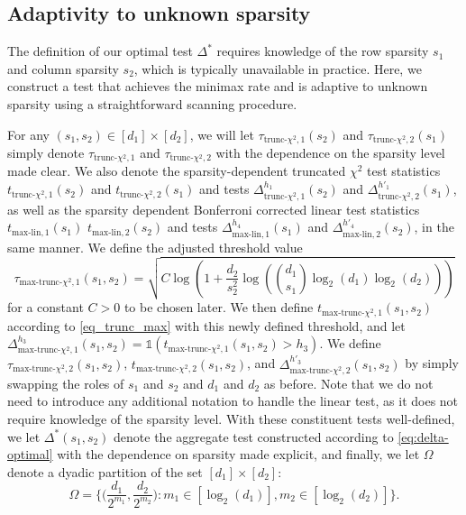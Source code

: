 \documentclass{article}
\newcommand{\one}{\mathds{1}}
\newcommand{\chisqlin}{\text{trunc-$\chi^2$}}
\newcommand{\chisqmax}{\text{max-trunc-$\chi^2$}}
\newcommand{\linmax}{\text{max-lin}}
\theoremstyle{remark}
\begin{document}
\subsection{Adaptivity to unknown sparsity}

The definition of our optimal test $\Delta^*$ requires knowledge of the row sparsity $s_1$ and column sparsity  $s_2$, which is typically unavailable in practice. Here, we construct a test that achieves the minimax rate and is adaptive to unknown sparsity using a straightforward scanning procedure.

For any $(s_1, s_2) \in [d_1] \times [d_2]$, we will let $\tau_{\chisqlin, 1}(s_2)$ and $\tau_{\chisqlin, 2}(s_1)$ simply denote $\tau_{\chisqlin, 1}$ and $\tau_{\chisqlin, 2}$ with the dependence on the sparsity level made clear. We also denote the sparsity-dependent truncated $\chi^2$ test statistics $t_{\chisqlin, 1}(s_2)$ and $t_{\chisqlin, 2}(s_1)$ and tests  $\Delta^{h_1}_{\chisqlin, 1}(s_2)$ and $\Delta^{h'_1}_{\chisqlin, 2}(s_1)$, as well as the sparsity dependent Bonferroni corrected linear test statistics $t_{\linmax, 1}(s_1)$ $t_{\linmax, 2}(s_2)$ and tests $\Delta^{h_4}_{\linmax, 1}(s_1)$ and $\Delta^{h'_4}_{\linmax, 2}(s_2)$, in the same manner. We define the adjusted threshold value
\begin{equation}
    \tau_{\chisqmax, 1}(s_1, s_2) = \sqrt{C\log\left(1 + \frac{d_2}{s_2^2}\log \left({d_1 \choose s_1}\log_2(d_1)\log_2(d_2)\right)\right)}
\end{equation}
for a constant $C > 0$ to be chosen later. We then define $t_{\chisqmax, 1}(s_1, s_2)$ according to \eqref{eq_trunc_max} with this newly defined threshold, and let $\Delta^{h_3}_{\chisqmax, 1}(s_1, s_2) = \one(t_{\chisqmax, 1}(s_1, s_2) > h_3)$. We define $\tau_{\chisqmax, 2}(s_1, s_2)$, $t_{\chisqmax, 2}(s_1, s_2)$, and $\Delta^{h'_3}_{\chisqmax, 2}(s_1, s_2)$ by simply swapping the roles of $s_1$ and $s_2$ and $d_1$ and $d_2$ as before. Note that we do not need to introduce any additional notation to handle the linear test, as it does not require knowledge of the sparsity level. With these constituent tests well-defined, we let $\Delta^*(s_1, s_2)$ denote the aggregate test constructed according to \eqref{eq:delta-optimal} with the dependence on sparsity made explicit, and finally, we let $\Omega$ denote a dyadic partition of the set $[d_1] \times [d_2]$:
\begin{equation}
    \Omega = \Bigg\{\Big(\frac{d_1}{2^{m_1}}, \frac{d_2}{2^{m_2}}\Big): m_1 \in [\log_2(d_1)], m_2 \in [\log_2(d_2)]  \Bigg\}.
\end{equation}
\end{document}
